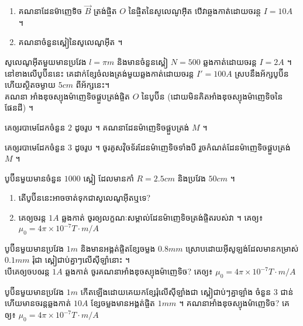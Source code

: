 \documentclass[12pt, a4paper]{article}
\begin{document}
\begin{enumerate}[m]
\begin{minipage}{0.60\textwidth}
	\begin{enumerate}[k]
		\item គណនាដែនម៉ាញេទិច $\vec{B}$ ត្រង់ផ្ចិត $O$ នៃផ្ចិតនៃសូលេណូអ៊ីត បើវាឆ្លងកាត់ដោយចរន្ត $I=10A$ ។
		\item គណនាចំនួនស្ពៀនៃសូលេណូអ៊ីត ។
	\end{enumerate}
	\end{minipage}
	\item សូលេណូអ៊ីតមួយមានប្រវែង $l=\pi m$ និងមានចំនួនស្ពៀ $N=500$ ឆ្លងកាត់ដោយចរន្ត $I=2A$ ។ នៅខាងលើបូប៊ីននេះ គេដាក់ខ្សែចំលងត្រង់មួយឆ្លងកាត់ដោយចរន្ត $I'=100A$ ស្របនឹងអ័ក្សបូប៊ីន ហើយស្ថិតចម្ងាយ $5cm$ ពីអ័ក្សនេះ។ \\
	គណនា អាំងឌុចស្យុងម៉ាញេទិចផ្គួបត្រង់ផ្ចិត $O$ នៃបូប៊ីន (ដោយមិនគិតអាំងឌុចស្យុងម៉ាញេទិចនៃផែនដី) ។\\
	\begin{minipage}{0.60\textwidth}
		\item គេឲ្យរបាមេដែកចំនួន $2$ ដូចរូប ។ គណនាដែនម៉ាញេទិចផ្គួបត្រង់
		$M$ ។
	\end{minipage}
	\begin{minipage}{0.60\textwidth}
		\item គេឲ្យរបាមេដែកចំនួន $3$ ដូចរូប ។ ចូរគូសវ៉ិចទ័រដែនម៉ាញេទិចទាំងបី រួចកំណត់ដែនម៉ាញេទិចផ្គួបត្រង់
		$M$ ។
	\end{minipage}
	\item បូប៊ីនមួយមានចំនួន $1000$ ស្ពៀ ដែលមានកាំ $R=2.5cm$ និងប្រវែង $50cm$ ។
	\begin{enumerate}[k]
		\item តើបូប៊ីននេះអាចចាត់ទុកជាសូលេណូអ៊ីតឬទេ?
		\item គេឲ្យចរន្ត $1A$ ឆ្លងកាត់ ចូរឲ្យលក្ខណៈសម្គាល់ដែនម៉ាញេទិចត្រង់ផ្ចិតរបស់វា ។ គេឲ្យ៖ $\mu_0=4\pi\times10^{-7}T\cdot m/A$
	\end{enumerate}
	\item បូប៊ីនមួយមានប្រវែង $1m$ និងមានអង្គត់ផ្ចិតខ្សែចម្លង $0.8mm$ ស្រោបដោយអ៊ីសូឡង់ដែលមានកម្រាស់ $0.1mm$ រុំជា ស្ពៀជាប់គ្នាៗលើស៊ីឡាំនោះ ។\\
	បើគេឲ្យចបឲរន្ត $1A$ ឆ្លងកាត់ ចូរគណនាអាំងឌុចស្យុងម៉ាញេទិច? គេឲ្យ៖ $\mu_0=4\pi\times10^{-7}T\cdot m/A$
	\item បូប៊ីនមួយមានប្រវែង $1m$  កើតឡើងដោយគេយកខ្សែរុំលើស៊ីឡាំងជា ស្ពៀជាប់ៗគ្នាឡាំង ចំនួន $3$ ជាន់ ហើយមានចរន្តឆ្លងកាត់ $10A$ ខ្សែចម្លងមានអង្គត់ផ្ចិត $1mm$ ។ គណនាអាំងឌុចស្យុងម៉ាញេទិច? គេឲ្យ៖ $\mu_0=4\pi\times10^{-7}T\cdot m/A$

\end{enumerate}
\end{document}
